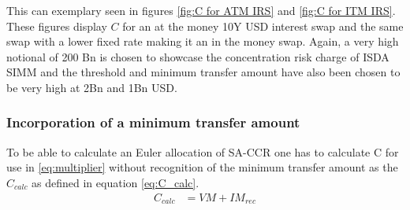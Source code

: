 \documentclass[../Thesis_AHoecherl.tex]{subfiles}
\begin{document}
    This can exemplary seen in figures \ref{fig:C for ATM IRS} and \ref{fig:C for ITM IRS}. These figures display $C$ for an at the money 10Y USD interest swap and the same swap with a lower fixed rate making it an in the money swap. Again, a very high notional of 200 Bn is chosen to showcase the concentration risk charge of ISDA SIMM and the threshold and minimum transfer amount have also been chosen to be very high at 2Bn and 1Bn USD.
    
    \subsubsection{Incorporation of a minimum transfer amount}

     To be able to calculate an Euler allocation of SA-CCR one has to calculate C for use in \ref{eq:multiplier} without recognition of the minimum transfer amount as the $C_{calc}$ as defined in equation \ref{eq:C_calc}.
    \begin{align}
        \label{eq:C_calc}
        C_{calc} &= VM + IM_{rec}
    \end{align}
    
\end{document}
